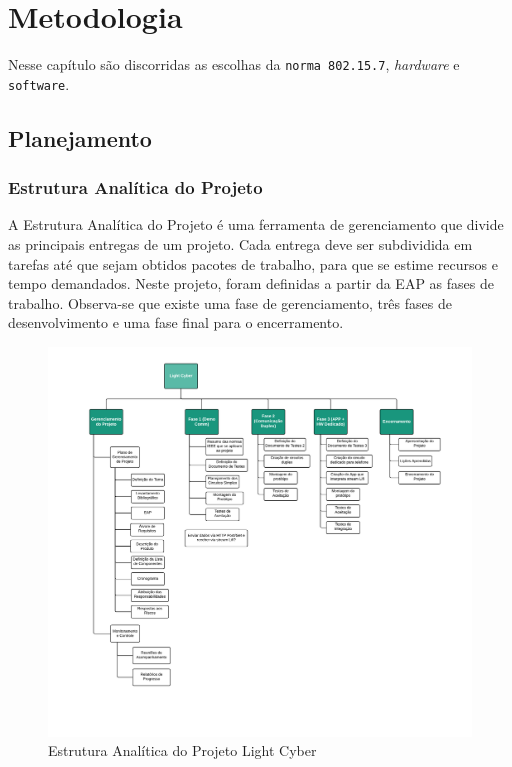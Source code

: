 	\chapter{Metodologia}\label{cap-metodologia}
	
	Nesse capítulo são discorridas as escolhas da \texttt{norma 802.15.7}, \textit{hardware} e \texttt{software}.
	
	\section{Planejamento}\label{sec-planejamento}
	
	\subsection{Estrutura Analítica do Projeto}\label{subsec-eap}
	
	A Estrutura Analítica do Projeto é uma ferramenta de gerenciamento que divide as principais entregas de um projeto. Cada entrega deve ser subdividida em tarefas até que sejam obtidos pacotes de trabalho, para que se estime recursos e tempo demandados. Neste projeto, foram definidas a partir da EAP as fases de trabalho. Observa-se que existe uma fase de gerenciamento, três fases de desenvolvimento e uma fase final para o encerramento.
	
	
	\begin{figure}[h!]
		\caption{\label{fig_eap} Estrutura Analítica do Projeto Light Cyber }
		\centering
			\includegraphics[width=1.0\textwidth, trim={1cm 1cm 1cm 1cm}, clip]{EAP.pdf}
	\end{figure}
	
